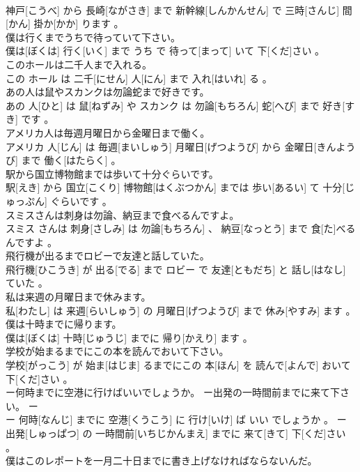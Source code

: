 \documentclass[8pt]{extreport}
\begin{document}
\begin{CJK}{UTF8}{min}
\\	神戸[こうべ] から 長崎[ながさき] まで 新幹線[しんかんせん] で 三時[さんじ] 間[かん] 掛か[かか] ります 。
\\	僕は行くまでうちで待っていて下さい。	
\\	僕は[ぼくは] 行く[いく] まで うち で 待って[まって] いて 下[くだ]さい 。
\\	このホールは二千人まで入れる。	
\\	この ホール は 二千[にせん] 人[にん] まで 入れ[はいれ] る 。
\\	あの人は鼠やスカンクは勿論蛇まで好きです。	
\\	あの 人[ひと] は 鼠[ねずみ] や スカンク は 勿論[もちろん] 蛇[へび] まで 好き[すき] です 。
\\	アメリカ人は毎週月曜日から金曜日まで働く。	
\\	アメリカ 人[じん] は 毎週[まいしゅう] 月曜日[げつようび] から 金曜日[きんようび] まで 働く[はたらく] 。
\\	駅から国立博物館までは歩いて十分ぐらいです。	
\\	駅[えき] から 国立[こくり] 博物館[はくぶつかん] までは 歩い[あるい] て 十分[じゅっぷん] ぐらいです 。
\\	スミスさんは刺身は勿論、納豆まで食べるんですよ。	
\\	スミス さんは 刺身[さしみ] は 勿論[もちろん] 、 納豆[なっとう] まで 食[た]べるんですよ 。
\\	飛行機が出るまでロビーで友達と話していた。	
\\	飛行機[ひこうき] が 出る[でる] まで ロビー で 友達[ともだち] と 話し[はなし] ていた 。
\\	私は来週の月曜日まで休みます。	
\\	私[わたし] は 来週[らいしゅう] の 月曜日[げつようび] まで 休み[やすみ] ます 。
\\	僕は十時までに帰ります。	
\\	僕は[ぼくは] 十時[じゅうじ] までに 帰り[かえり] ます 。
\\	学校が始まるまでにこの本を読んでおいて下さい。	
\\	学校[がっこう] が 始ま[はじま] るまでにこの 本[ほん] を 読んで[よんで] おいて 下[くだ]さい 。
\\	ー何時までに空港に行けばいいでしょうか。 ー出発の一時間前までに来て下さい。	ー
\\	ー 何時[なんじ] までに 空港[くうこう] に 行け[いけ] ば いい でしょうか 。 ー 出発[しゅっぱつ] の 一時間前[いちじかんまえ] までに 来て[きて] 下[くだ]さい 。
\\	僕はこのレポートを一月二十日までに書き上げなければならないんだ。	

\end{CJK}
\end{document}

